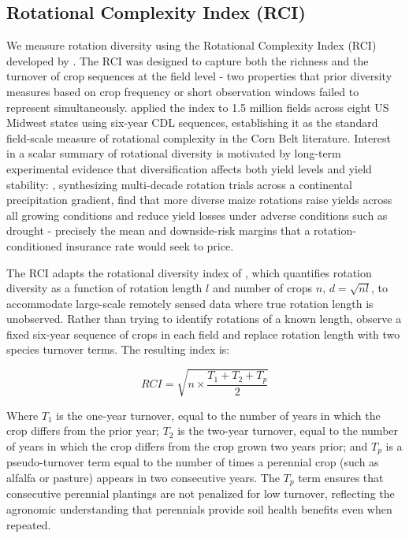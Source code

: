 \documentclass[12pt,letterpaper]{article}
\theoremstyle{remark}
\theoremstyle{remark}
\theoremstyle{plain}
\theoremstyle{definition}
\begin{document}
\subsection{\label{subsec:rci}Rotational Complexity Index (RCI)}
We measure rotation diversity using the Rotational Complexity Index (RCI) developed by \citet{socolar2021}. The RCI was designed to capture both the richness and the turnover of crop sequences at the field level - two properties that prior diversity measures based on crop frequency or short observation windows failed to represent simultaneously. \citet{socolar2021} applied the index to 1.5 million fields across eight US Midwest states using six-year CDL sequences, establishing it as the standard field-scale measure of rotational complexity in the Corn Belt literature. Interest in a scalar summary of rotational diversity is motivated by long-term experimental evidence that diversification affects both yield levels and yield stability: \citet{bowles2020}, synthesizing multi-decade rotation trials across a continental precipitation gradient, find that more diverse maize rotations raise yields across all growing conditions and reduce yield losses under adverse conditions such as drought - precisely the mean and downside-risk margins that a rotation-conditioned insurance rate would seek to price.

The RCI adapts the rotational diversity index of \citet{Tiemann2015}, which quantifies rotation diversity as a function of rotation length $l$ and number of crops $n$, $d = \sqrt{nl}$, to accommodate large-scale remotely sensed data where true rotation length is unobserved. Rather than trying to identify rotations of a known length, \citet{socolar2021} observe a fixed six-year sequence of crops in each field and replace rotation length with two species turnover terms. The resulting index is:

\begin{equation}
    RCI = \sqrt{n\times \dfrac{T_{1}+T_{2}+T_{p}}{2}}\label{eq:rci}
\end{equation}

Where $T_{1}$ is the one-year turnover, equal to the number of years in which the crop differs from the prior year; $T_{2}$ is the two-year turnover, equal to the number of years in which the crop differs from the crop grown two years prior; and $T_{p}$ is a pseudo-turnover term equal to the number of times a perennial crop (such as alfalfa or pasture) appears in two consecutive years. The $T_{p}$ term ensures that consecutive perennial plantings are not penalized for low turnover, reflecting the agronomic understanding that perennials provide soil health benefits even when repeated.
\end{document}
